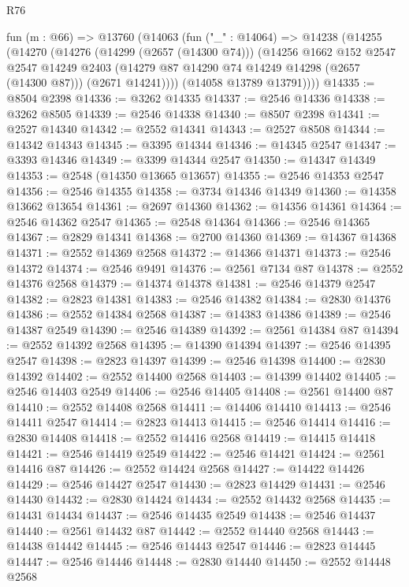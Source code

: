 \begin{lexlean}{R76}
\begin{coremodule}
  fun (m : @66) =>
  @13760
    (@14063
      (fun ("_" : @14064) =>
      @14238
        (@14255
          (@14270
            (@14276
              (@14299 (@2657 (@14300 @74)))
              (@14256
                @1662
                @152
                @2547
                @2547
                @14249
                @2403
                (@14279 @87 @14290 @74 @14249 @14298 (@2657 (@14300 @87)))
                (@2671 @14241))))
          (@14058 @13789 @13791))))
@14335 := @8504 @2398
@14336 := @3262 @14335
@14337 := @2546 @14336
@14338 := @3262 @8505
@14339 := @2546 @14338
@14340 := @8507 @2398
@14341 := @2527 @14340
@14342 := @2552 @14341
@14343 := @2527 @8508
@14344 := @14342 @14343
@14345 := @3395 @14344
@14346 := @14345 @2547
@14347 := @3393 @14346
@14349 := @3399 @14344 @2547
@14350 := @14347 @14349
@14353 := @2548 (@14350 @13665 @13657)
@14355 := @2546 @14353 @2547
@14356 := @2546 @14355
@14358 := @3734 @14346 @14349
@14360 := @14358 @13662 @13654
@14361 := @2697 @14360
@14362 := @14356 @14361
@14364 := @2546 @14362 @2547
@14365 := @2548 @14364
@14366 := @2546 @14365
@14367 := @2829 @14341
@14368 := @2700 @14360
@14369 := @14367 @14368
@14371 := @2552 @14369 @2568
@14372 := @14366 @14371
@14373 := @2546 @14372
@14374 := @2546 @9491
@14376 := @2561 @7134 @87
@14378 := @2552 @14376 @2568
@14379 := @14374 @14378
@14381 := @2546 @14379 @2547
@14382 := @2823 @14381
@14383 := @2546 @14382
@14384 := @2830 @14376
@14386 := @2552 @14384 @2568
@14387 := @14383 @14386
@14389 := @2546 @14387 @2549
@14390 := @2546 @14389
@14392 := @2561 @14384 @87
@14394 := @2552 @14392 @2568
@14395 := @14390 @14394
@14397 := @2546 @14395 @2547
@14398 := @2823 @14397
@14399 := @2546 @14398
@14400 := @2830 @14392
@14402 := @2552 @14400 @2568
@14403 := @14399 @14402
@14405 := @2546 @14403 @2549
@14406 := @2546 @14405
@14408 := @2561 @14400 @87
@14410 := @2552 @14408 @2568
@14411 := @14406 @14410
@14413 := @2546 @14411 @2547
@14414 := @2823 @14413
@14415 := @2546 @14414
@14416 := @2830 @14408
@14418 := @2552 @14416 @2568
@14419 := @14415 @14418
@14421 := @2546 @14419 @2549
@14422 := @2546 @14421
@14424 := @2561 @14416 @87
@14426 := @2552 @14424 @2568
@14427 := @14422 @14426
@14429 := @2546 @14427 @2547
@14430 := @2823 @14429
@14431 := @2546 @14430
@14432 := @2830 @14424
@14434 := @2552 @14432 @2568
@14435 := @14431 @14434
@14437 := @2546 @14435 @2549
@14438 := @2546 @14437
@14440 := @2561 @14432 @87
@14442 := @2552 @14440 @2568
@14443 := @14438 @14442
@14445 := @2546 @14443 @2547
@14446 := @2823 @14445
@14447 := @2546 @14446
@14448 := @2830 @14440
@14450 := @2552 @14448 @2568

\end{coremodule}
\end{lexlean}
